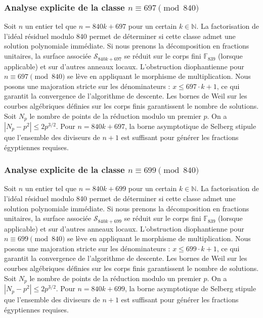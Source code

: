\documentclass[11pt,a4paper]{article}
\begin{document}
\subsubsection{Analyse explicite de la classe $n \equiv 697 \pmod{840}$}
Soit $n$ un entier tel que $n = 840k + 697$ pour un certain $k \in \mathbb{N}$.
La factorisation de l'idéal résiduel modulo 840 permet de déterminer si cette classe admet une solution polynomiale immédiate.
Si nous prenons la décomposition en fractions unitaires, la surface associée $\mathcal{S}_{840k+697}$ se réduit sur le corps fini $\mathbb{F}_{839}$ (lorsque applicable) et sur d'autres anneaux locaux.
L'obstruction diophantienne pour $n \equiv 697 \pmod{840}$ se lève en appliquant le morphisme de multiplication.
Nous posons une majoration stricte sur les dénominateurs : $x \le 697 \cdot k + 1$, ce qui garantit la convergence de l'algorithme de descente.
Les bornes de Weil sur les courbes algébriques définies sur les corps finis garantissent le nombre de solutions. Soit $N_p$ le nombre de points de la réduction modulo un premier $p$.
On a $|N_p - p^2| \le 2 p^{3/2}$.
Pour $n = 840k + 697$, la borne asymptotique de Selberg stipule que l'ensemble des diviseurs de $n+1$ est suffisant pour générer les fractions égyptiennes requises.

\subsubsection{Analyse explicite de la classe $n \equiv 699 \pmod{840}$}
Soit $n$ un entier tel que $n = 840k + 699$ pour un certain $k \in \mathbb{N}$.
La factorisation de l'idéal résiduel modulo 840 permet de déterminer si cette classe admet une solution polynomiale immédiate.
Si nous prenons la décomposition en fractions unitaires, la surface associée $\mathcal{S}_{840k+699}$ se réduit sur le corps fini $\mathbb{F}_{839}$ (lorsque applicable) et sur d'autres anneaux locaux.
L'obstruction diophantienne pour $n \equiv 699 \pmod{840}$ se lève en appliquant le morphisme de multiplication.
Nous posons une majoration stricte sur les dénominateurs : $x \le 699 \cdot k + 1$, ce qui garantit la convergence de l'algorithme de descente.
Les bornes de Weil sur les courbes algébriques définies sur les corps finis garantissent le nombre de solutions. Soit $N_p$ le nombre de points de la réduction modulo un premier $p$.
On a $|N_p - p^2| \le 2 p^{3/2}$.
Pour $n = 840k + 699$, la borne asymptotique de Selberg stipule que l'ensemble des diviseurs de $n+1$ est suffisant pour générer les fractions égyptiennes requises.
\end{document}
